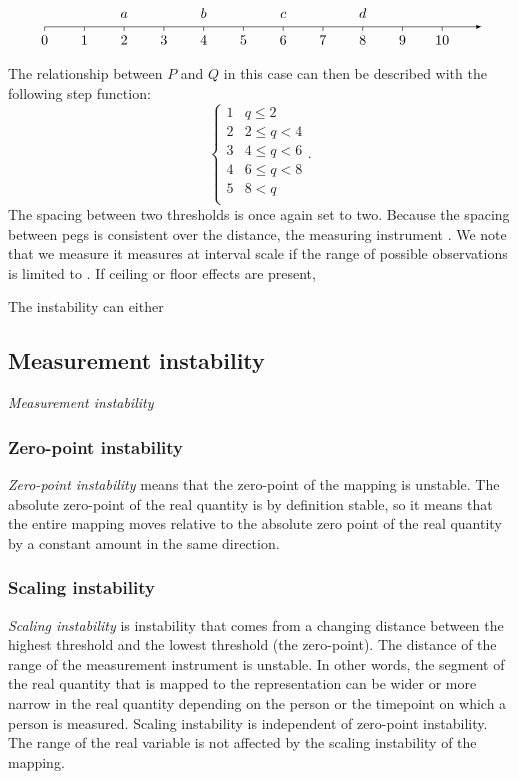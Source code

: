 \documentclass[utf8]{FrontiersinVancouver}
\begin{document}
\[
\begin{tikzpicture}
    \draw[-latex] (0,0) -- (11,0);
    \foreach \x in {0,...,10}
        \draw (\x,0) -- (\x,-3pt);
    \foreach \x in {0,...,10}
        \node [below] at (\x,-0.1) {$\x$};
    \foreach \x\y in {2/a,4/b,6/c,8/d}
        \node [above] at (\x,0.1) {$\y$};
\end{tikzpicture}
\]

The relationship between $P$ and $Q$ in this case can then be described with the following step function:
\[
\begin{cases} 
    1 & q \leq 2\\
    2 & 2 \leq q < 4\\
    3 & 4 \leq q < 6\\
    4 & 6 \leq q < 8\\    
    5 & 8 < q\\
\end{cases}.
\]
The spacing between two thresholds is once again set to two. Because the spacing between pegs is consistent over the distance, the measuring instrument . We note that we measure  it measures at interval scale if the range of possible observations is limited to . If ceiling or floor effects are present, 

The instability can either 

\subsection{Measurement instability}
\textit{Measurement instability} 

\subsubsection{Zero-point instability}
\textit{Zero-point instability} means that the zero-point of the mapping is unstable. The absolute zero-point of the real quantity is by definition stable, so it means that the entire mapping moves relative to the absolute zero point of the real quantity by a constant amount in the same direction. 

\subsubsection{Scaling instability}
\textit{Scaling instability} is instability that comes from a changing distance between the highest threshold and the lowest threshold (the zero-point). The distance of the range of the measurement instrument is unstable. In other words, the segment of the real quantity that is mapped to the representation can be wider or more narrow in the real quantity depending on the person or the timepoint on which a person is measured. Scaling instability is independent of zero-point instability. The range of the real variable is not affected by the scaling instability of the mapping.
\end{document}
